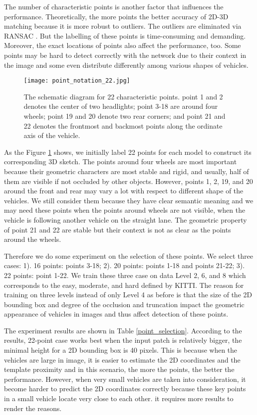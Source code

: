 The number of characteristic points is another factor that influences the performance. Theoretically, the more points the better accuracy of 2D-3D matching because it is more robust to outliers. The outliers are eliminated via RANSAC \cite{Fischler:1981:RSC:358669.358692}. But the labelling of these points is time-consuming and demanding. Moreover, the exact locations of points also affect the performance, too. Some points may be hard to detect correctly with the network due to their context in the image and some even distribute differently among various shapes of vehicles. 

\begin{figure}[ht]		
	\texttt{[image: point\_notation\_22.jpg]}
	\caption{The schematic diagram for 22 characteristic points. point 1 and 2 denotes the center of two headlights; point 3-18 are around four wheels; point 19 and 20 denote two rear corners; and point 21 and 22 denotes the frontmost and  backmost points along the ordinate axis of the vehicle.}
	\centering
	\label{figure:point_notation_22}
\end{figure}

As the Figure \ref{figure:point_notation_22} shows, we initially label 22 points for each model to construct its corresponding 3D sketch. The points around four wheels are most important because their geometric characters are most stable and rigid, and usually, half of them are visible if not occluded by other objects. However, points 1, 2, 19, and 20 around the front and rear may vary a lot with respect to different shape of the vehicles. We still consider them because they have clear semantic meaning and we may need these points when the points around wheels are not visible, \eg when the vehicle is following another vehicle on the straight lane. The geometric property of point 21 and 22 are stable but their context is not as clear as the points around the wheels.

Therefore we do some experiment on the selection of these points. We select three cases: 1). 16 points: points 3-18; 2). 20 points: points 1-18 and points 21-22; 3). 22 points: point 1-22. We train these three case on data Level 2, 6, and 8 which corresponds to the easy, moderate, and hard defined by KITTI. The reason for training on three levels instead of only Level 4 as before is that the size of the 2D bounding box and degree of the occlusion and truncation impact the geometric appearance of vehicles in images and thus affect detection of these points.

The experiment results are shown in Table \ref{point_selection}.  According to the results, 22-point case works best when the input patch is relatively bigger, \ie the minimal height for a 2D bounding box is 40 pixels. This is because when the vehicles are large in image, it is easier to estimate the 2D coordinates and the template proximity and in this scenario, the more the points, the better the performance. However, when very small vehicles are taken into consideration, it become harder to predict the 2D coordinates correctly because these key points in a small vehicle locate very close to each other. \tbd it requires more results to render the reasons.



